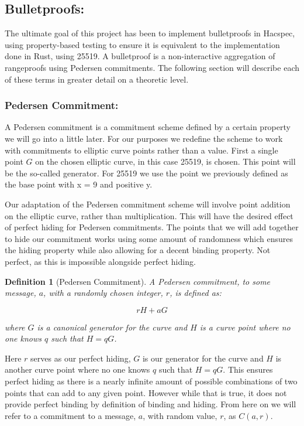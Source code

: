 \documentclass{article}
\newtheorem{definition}{Definition}[section]
\begin{document}
\subsection{Bulletproofs:}\label{Bulletproofs}

The ultimate goal of this project has been to implement bulletproofs in
Hacspec, using property-based testing to ensure it is equivalent to the
implementation done in Rust, using 25519. A bulletproof is a
non-interactive aggregation of rangeproofs using Pedersen commitments.
The following section will describe each of these terms in greater detail
on a theoretic level.

\subsubsection{Pedersen Commitment:}

A Pedersen commitment is a commitment scheme defined by a certain
property we will go into a little later. For our purposes we redefine
the scheme to work with commitments to elliptic curve points rather than
a value. First a single point $G$ on the chosen elliptic curve, in this
case 25519, is chosen. This point will be the so-called generator. For 25519 we use the point
we previously defined as the base point with x = 9 and positive y. 

Our adaptation of the Pedersen commitment scheme will involve point
addition on the elliptic curve, rather than multiplication. This will
have the desired effect of perfect hiding for Pedersen commitments. The
points that we will add together to hide our commitment works using some
amount of randomness which ensures the hiding property while also
allowing for a decent binding property. Not perfect, as this is impossible
alongside perfect hiding. 

\begin{definition}[Pedersen Commitment]
	A Pedersen commitment, to some message, $a$, with a randomly chosen
	integer, $r$, is defined as:

	$$rH + aG$$

	where $G$ is a canonical generator for the curve and $H$ is a curve point where no one knows $q$ such that $H = qG$.
\end{definition}

Here $r$ serves as our perfect hiding, $G$ is our generator for the
curve and $H$ is another curve point where no one knows $q$ such that
$H = qG$. This ensures perfect hiding as there is a nearly infinite
amount of possible combinations of two points that can add to any given
point. However while that is true, it does not provide perfect binding by
definition of binding and hiding. From here on we will refer to a
commitment to a message, $a$, with random value, $r$, as $C(a,r)$.
\end{document}
